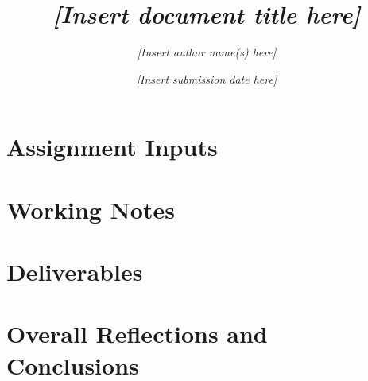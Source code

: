 \documentclass[12pt,a4paper]{article}
\begin{document}
\title{\textit{[Insert document title here]}}
\author{\textit{[Insert author name(s) here]}}
\date{\textit{[Insert submission date here]}}

\maketitle

\setcounter{secnumdepth}{-1}
\makeatletter
\renewcommand{\numberline}[1]{}
\makeatother

\tableofcontents
\newpage

\section*{Assignment Inputs}

\newpage

\section*{Working Notes}

\newpage

\section*{Deliverables}

\newpage

\section*{Overall Reflections and Conclusions}

\newpage



\end{document}
